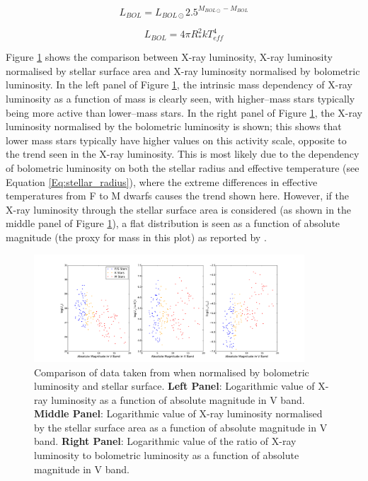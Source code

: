 \begin{equation}
    L_{BOL} = L_{BOL\odot} 2.5^{M_{BOL\odot} - M_{BOL}}
    \label{Eq:bolometric_luminosity}
\end{equation}

\begin{equation}
    L_{BOL} = 4\pi R_{*}^{2}kT_{eff}^{4}
    \label{Eq:stellar_radius}
\end{equation}

Figure \ref{fig:Lx_normalise_schmitt_data} shows the comparison between X-ray luminosity, X-ray luminosity normalised by stellar surface area and X-ray luminosity normalised by bolometric luminosity. In the left panel of Figure \ref{fig:Lx_normalise_schmitt_data}, the intrinsic mass dependency of X-ray luminosity as a function of mass is clearly seen, with higher--mass stars typically being more active than lower--mass stars. In the right panel of Figure \ref{fig:Lx_normalise_schmitt_data}, the X-ray luminosity normalised by the bolometric luminosity is shown; this shows that lower mass stars typically have higher values on this activity scale, opposite to the trend seen in the X-ray luminosity. This is most likely due to the dependency of bolometric luminosity on both the stellar radius and effective temperature (see Equation \ref{Eq:stellar_radius}), where the extreme differences in effective temperatures from F to M dwarfs causes the trend shown here. However, if the X-ray luminosity through the stellar surface area is considered (as shown in the middle panel of Figure \ref{fig:Lx_normalise_schmitt_data}), a flat distribution is seen as a function of absolute magnitude (the proxy for mass in this plot) as reported by \citet{Schmitt_Liefke_2004}.

\begin{figure}
    \centering
    \includegraphics[width=0.9\textwidth]{Figures/3-Xray_age/normalise_schmitt_data.pdf}
    \caption[Comparison of X-ray luminosity and normalised parameters]{Comparison of data taken from \citet{Schmitt_Liefke_2004} when normalised by bolometric luminosity and stellar surface. \textbf{Left Panel}: Logarithmic value of X-ray luminosity as a function of absolute magnitude in V band. \textbf{Middle Panel}: Logarithmic value of X-ray luminosity normalised by the stellar surface area as a function of absolute magnitude in V band. \textbf{Right Panel}: Logarithmic value of the ratio of X-ray luminosity to bolometric luminosity as a function of absolute magnitude in V band.}
    \label{fig:Lx_normalise_schmitt_data}
\end{figure}

